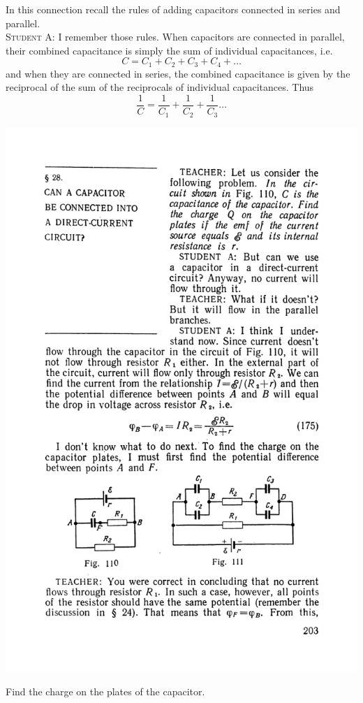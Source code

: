 \documentclass[a4paper,sfsidenotes]{tufte-book}
\begin{document}
In this connection recall the rules of adding capacitors connected in series and parallel.
\\
\textsc{Student A:} I remember those rules. When capacitors are connected in parallel, their combined capacitance is simply the sum of individual capacitances, i.e. 
\begin{equation}%
C = C_{1} + C_{2} +C_{3} +C_{4} +\ldots 
\label{eq-177}
\end{equation}
 and when they are connected in series, the combined capacitance is given by the reciprocal of the sum of the reciprocals of individual capacitances. Thus
 \begin{equation}
\frac{1}{C} = \frac{1}{C_{1}}+ \frac{1}{C_{2}}+ \frac{1}{C_{3}} \ldots
 \label{eq-178}
\end{equation}
\begin{marginfigure}%
\centering
\includegraphics[width=0.8\linewidth]{fig-111a}
\caption{Find the charge on the plates of the capacitor.}
\label{fig-111}
\end{marginfigure}
\end{document}

